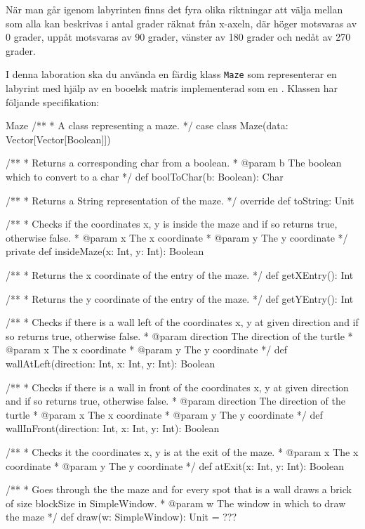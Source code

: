 När man går igenom labyrinten finns det fyra olika riktningar att välja mellan som alla kan beskrivas i antal grader räknat från x-axeln, där höger motsvaras av 0 grader, uppåt motsvaras av 90 grader, vänster av 180 grader och nedåt av 270 grader.

I denna laboration ska du använda en färdig klass \texttt{Maze} som representerar en labyrint med hjälp av en booelsk matris implementerad som en \code{Vector[Vector[Boolean]}. 
Klassen har följande specifikation:

\begin{ScalaSpec}{Maze}
/**
 *  A class representing a maze.
 */
case class Maze(data: Vector[Vector[Boolean]]) {
  
  /**
   *  Returns a corresponding char from a boolean.
   *  @param b	The boolean which to convert to a char
   */
  def boolToChar(b: Boolean): Char

  /**
   *  Returns a String representation of the maze.
   */
  override def toString: Unit

  /**
   *  Checks if the coordinates x, y is inside the maze and if 
   so returns true, otherwise false.
   *  @param x		The x coordinate
   *  @param y		The y coordinate
   */
  private def insideMaze(x: Int, y: Int): Boolean

  /**
   *  Returns the x coordinate of the entry of the maze.
   */
  def getXEntry(): Int

  /**
   * Returns the y coordinate of the entry of the maze.
   */
  def getYEntry(): Int

  /**
   *  Checks if there is a wall left of the coordinates x, y at 
   given direction and if so returns true, otherwise false.
   *  @param direction	The direction of the turtle
   *  @param x					The x coordinate
   *  @param y					The y coordinate
   */
  def wallAtLeft(direction: Int, x: Int, y: Int): Boolean

  /**
   *  Checks if there is a wall in front of the coordinates x, y at 
   given direction and if so returns true, otherwise false.
   *  @param direction	The direction of the turtle
   *  @param x					The x coordinate
   *  @param y					The y coordinate
   */
  def wallInFront(direction: Int, x: Int, y: Int): Boolean

  /**
   *  Checks it the coordinates x, y is at the exit of the maze.
   *  @param x					The x coordinate
   *  @param y					The y coordinate
   */
  def atExit(x: Int, y: Int): Boolean

  /**
   *  Goes through the the maze and for every spot that is a wall 
   draws a brick of size blockSize in SimpleWindow.
   *  @param w		The window in which to draw the maze
   */
  def draw(w: SimpleWindow): Unit = ???
}


\end{ScalaSpec}
